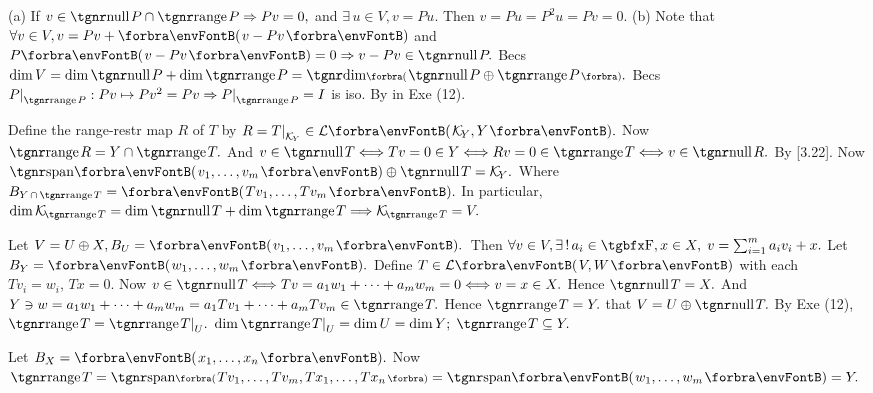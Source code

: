 (a) If $v\in\null P\cap\range P\Rightarrow Pv=0,$ and $\exists\,u\in V,v=Pu.$ Then $v=Pu=P^2 u=Pv=0.$\parSol{}
(b) Note that $\forall v\in V,v=Pv+\Par{v-Pv}$ and $P\Par{v-Pv}=0\Rightarrow v-Pv\in\null P.$\parSol{\Hb}
\Or Becs $\dim V=\dim\null P+\dim\range P=\Dim\BigPar{\null P\oplus\range P}.$\PfEnd{\vspace{3pt}}\parSol{}
\Or Becs $P\mmid_{\range P}:Pv\mapsto Pv^2=Pv\Rightarrow P\mmid_{\range P}=I$ is iso. By {\COROLLARY} in Exe (12).\PfEnd
\SepLine

Define the range-restr map $R$ of $T$ by $R=T\mmid_{\mathcal{K}_{\!Y}}\in\Lm{\mathcal{K}_{\!Y},Y}.$ Now $\range R=Y\cap \range T.$\parSol{}
And $v\in\null T\Longleftrightarrow Tv=0\in Y\Longleftrightarrow Rv=0\in\range T\Longleftrightarrow v\in\null R.$ By [3.22].\PfEnd\vspace{2pt}
\AComm Now $\Span{v_1,\dots,v_m}\oplus\null T=\mathcal{K}_{\!Y}.$ {Where $B_{Y\,\cap\,\range T}=\Par{Tv_1,\dots,Tv_m}.$}\vspace{0pt}\parCom
In particular, $\dim\mathcal{K}_{\!\range T}=\dim\null T+\dim\range T\Longrightarrow\mathcal{K}_{\!\range T}=V.$
\SepLine

Let $V=U\oplus X,B_U=\Par{v_1,\dots,v_m}.$ \,Then $\forall v\in V,\exists\,!\,a_i\in\Fbb,x\in X,\;v=\sum_{i=1}^m a_i v_i+x.$\parSol{}
Let $B_Y=\Par{w_1,\dots,w_m}.$ Define $T\in\Lm{V,W}$ with each $T{v_i}=w_i,\,Tx=0.$\parSol{}
Now $v\in\null T\Longleftrightarrow Tv=a_1w_1+\dots+a_mw_m=0\Longleftrightarrow v=x\in X.$ \;Hence $\null T=X.$\parSol{}
And $Y\ni w=a_1 w_1+\dots+a_m w_m=a_1 Tv_1+\dots+a_m Tv_m\in\range T.$ \;Hence $\range T=Y.$\parSol{}
\Or \NOTICE that $V=U\oplus\null T.$ By Exe (12), $\range T=\range T\mmid_U.$\parSol{}
{\Blind{\Or}}\又 $\dim\range T\mmid_U=\dim U=\dim Y;\;\range T\subseteq Y.$\par\quad
\Or Let $B_X=\Par{x_1,\dots,x_n}.$ Now $\range T=\Span[\BigPar]{Tv_1,\dots,Tv_m,Tx_1,\dots,Tx_n}=\Span{w_1,\dots,w_m}=Y.$\PfEnd
\SepLine

